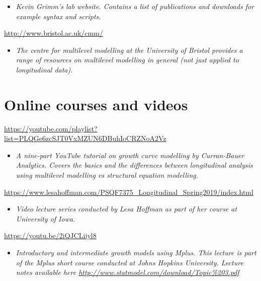 \documentclass[
]{book}
\providecommand{\tightlist}{%
  \setlength{\itemsep}{0pt}\setlength{\parskip}{0pt}}
\begin{document}
\begin{itemize}
\tightlist
\item
  \emph{Kevin Grimm's lab website. Contains a list of publications and downloads for example syntax and scripts. }
\end{itemize}

\url{http://www.bristol.ac.uk/cmm/}

\begin{itemize}
\tightlist
\item
  \emph{The centre for multilevel modelling at the University of Bristol provides a range of resources on multilevel modelling in general (not just applied to longitudinal data). }
\end{itemize}

\hypertarget{online-courses-and-videos-1}{%
\section{Online courses and videos}\label{online-courses-and-videos-1}}

\url{https://youtube.com/playlist?list=PLQGe6zcSJT0VxMZUN6DBuhIoCRZNoA2Vz}

\begin{itemize}
\tightlist
\item
  \emph{A nine-part YouTube tutorial on growth curve modelling by Curran-Bauer Analytics. Covers the basics and the differences between longitudinal analysis using multilevel modelling vs structural equation modelling.}
\end{itemize}

\url{https://www.lesahoffman.com/PSQF7375_Longitudinal_Spring2019/index.html}

\begin{itemize}
\tightlist
\item
  \emph{Video lecture series conducted by Lesa Hoffman as part of her course at University of Iowa. }
\end{itemize}

\url{https://youtu.be/2iQJCLiiyl8}

\begin{itemize}
\tightlist
\item
  \emph{Introductory and intermediate growth models using Mplus. This lecture is part of the Mplus short course conducted at Johns Hopkins University. Lecture notes available here \url{http://www.statmodel.com/download/Topic\%203.pdf} }
\end{itemize}
\end{document}
